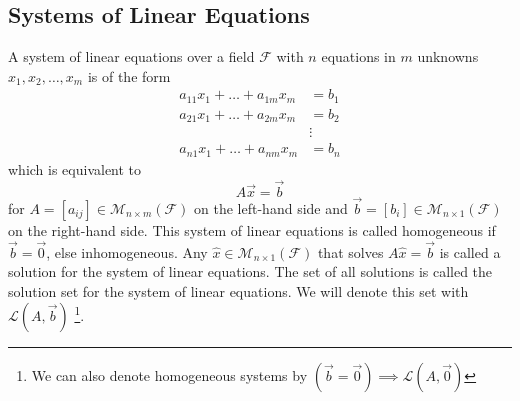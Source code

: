 \subsection{Systems of Linear Equations}\label{subsec-system-of-linear-equations}

\begin{definition}\label{def-linear-equation-system}
	A system of linear equations over a field $\mathcal{F}$ with $n$ equations in
	$m$ unknowns $x_1, x_2, \dots, x_m$ is of the form
	\begin{align*}
		a_{11}x_1 + \dots + a_{1m}x_m & = b_1  \\
		a_{21}x_1 + \dots + a_{2m}x_m & = b_2  \\
		                              & \vdots \\
		a_{n1}x_1 + \dots + a_{nm}x_m & = b_n
	\end{align*}
	which is equivalent to
	\begin{equation*}
		A\vec{x}=\vec{b}
	\end{equation*}
	for $A=[a_{ij}]\in\mathcal{M}_{n \times m}(\mathcal{F})$ on the left-hand side and
	$\vec{b}=[b_i]\in\mathcal{M}_{n \times 1}(\mathcal{F})$ on the right-hand side.
	This system of linear equations is called homogeneous if $\vec{b}=\vec{0}$, else
	inhomogeneous. Any $\hat{x}\in\mathcal{M}_{n \times 1}(\mathcal{F})$ that solves
	$A\hat{x}=\vec{b}$ is called a solution for the system of linear equations. The
	set of all solutions is called the solution set for the system of linear equations.
	We will denote this set with $\mathcal{L}(A,\vec{b})$ \cite[p.77]{liesenMehrmann2015}
	\footnote{We can also denote homogeneous systems by
		$(\vec{b}=\vec{0})\implies\mathcal{L}(A,\vec{0})$}.
\end{definition}

